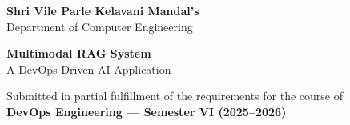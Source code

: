 \documentclass[12pt,a4paper]{report}
\begin{document}

\begin{titlepage}
    \centering
    \vspace*{0.5cm}

    \begin{figure}[H]
        \centering
    \end{figure}

    \vspace{0.5cm}
    {\large\bfseries Shri Vile Parle Kelavani Mandal's}\\[0.2cm]
    {\large Department of Computer Engineering}\\[0.8cm]

    \begin{mdframed}[linecolor=primaryblue, linewidth=2pt]
    \centering\vspace{0.4cm}
    {\Huge\bfseries\color{primaryblue} Multimodal RAG System}\\[0.4cm]
    {\Large\color{accentorange} A DevOps-Driven AI Application}\\[0.3cm]
    \vspace{0.2cm}
    \end{mdframed}

    \vspace{0.8cm}
    {\large Submitted in partial fulfillment of the requirements for the course of}\\[0.3cm]
    {\large\bfseries DevOps Engineering --- Semester VI (2025--2026)}

    \vspace{1cm}


\end{titlepage}
\end{document}
